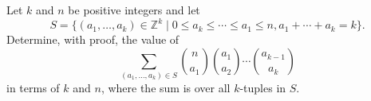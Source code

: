 Let $k$ and $n$ be positive integers and let 
\[S=\{(a_1,\ldots,a_k)\in \mathbb{Z}^{k}\;|\; 0\leq a_k\leq\cdots\leq a_1 \leq n,a_1+\cdots+a_k=k\}.\]
Determine, with proof, the value of
\[\sum_{(a_1,\ldots,a_k)\in S}\binom{n}{a_1}\binom{a_1}{a_2}\cdots\binom{a_{k-1}}{a_k}\]
in terms of $k$ and $n$, where the sum is over all $k$-tuples in $S$.
